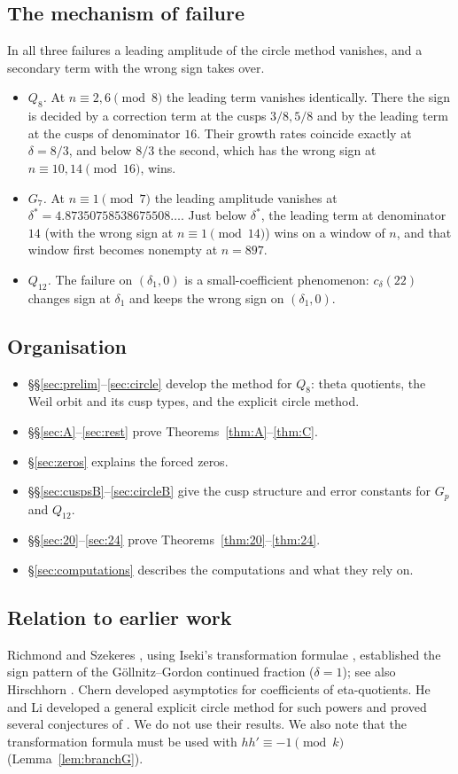 \documentclass[11pt]{amsart}
\theoremstyle{remark}
\theoremstyle{definition}
\begin{document}
\subsection*{The mechanism of failure}
In all three failures a leading amplitude of the circle method vanishes, and a secondary term with the wrong sign takes over.
\begin{itemize}[leftmargin=2em]
\item \emph{$Q_8$.} At $n\equiv2,6\pmod8$ the leading term vanishes identically. There the sign is decided by a correction term at the cusps $3/8,5/8$ and by the leading term at the cusps of denominator $16$. Their growth rates coincide exactly at $\delta=8/3$, and below $8/3$ the second, which has the wrong sign at $n\equiv10,14\pmod{16}$, wins.
\item \emph{$G_7$.} At $n\equiv1\pmod7$ the leading amplitude vanishes at $\delta^*=4.87350758538675508\ldots$. Just below $\delta^*$, the leading term at denominator $14$ (with the wrong sign at $n\equiv1\pmod{14}$) wins on a window of $n$, and that window first becomes nonempty at $n=897$.
\item \emph{$Q_{12}$.} The failure on $(\delta_1,0)$ is a small-coefficient phenomenon: $c_\delta(22)$ changes sign at $\delta_1$ and keeps the wrong sign on $(\delta_1,0)$.
\end{itemize}

\subsection*{Organisation}
\begin{itemize}[leftmargin=2em]
\item \S\S\ref{sec:prelim}--\ref{sec:circle} develop the method for $Q_8$: theta quotients, the Weil orbit and its cusp types, and the explicit circle method.
\item \S\S\ref{sec:A}--\ref{sec:rest} prove Theorems~\ref{thm:A}--\ref{thm:C}.
\item \S\ref{sec:zeros} explains the forced zeros.
\item \S\S\ref{sec:cuspsB}--\ref{sec:circleB} give the cusp structure and error constants for $G_p$ and $Q_{12}$.
\item \S\S\ref{sec:20}--\ref{sec:24} prove Theorems~\ref{thm:20}--\ref{thm:24}.
\item \S\ref{sec:computations} describes the computations and what they rely on.
\end{itemize}

\subsection*{Relation to earlier work}
Richmond and Szekeres \cite{RS}, using Iseki's transformation formulae \cite{Iseki}, established the sign pattern of the G\"ollnitz--Gordon continued fraction ($\delta=1$); see also Hirschhorn \cite{Hirschhorn}. Chern \cite{Chern} developed asymptotics for coefficients of eta-quotients. He and Li \cite{HL} developed a general explicit circle method for such powers and proved several conjectures of \cite{SZ}. We do not use their results. We also note that the transformation formula \cite[Prop.~7]{SZ} must be used with $hh'\equiv-1\pmod k$ (Lemma~\ref{lem:branchG}).
\end{document}
